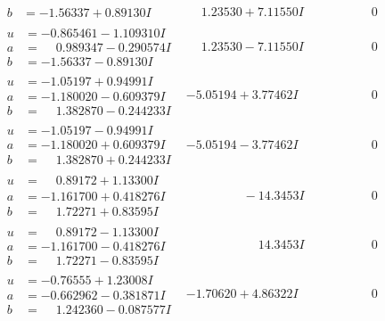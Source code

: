 \documentclass[1p]{elsarticle_modified}
\theoremstyle{definition}
\begin{document}
$$\begin{array}{c|c|c}
\begin{aligned}
b &= -1.56337 + 0.89130 I\end{aligned}
 & \phantom{-}1.23530 + 7.11550 I & \phantom{-0.000000 } 0 \\ \hline\begin{aligned}
u &= -0.865461 - 1.109310 I \\
a &= \phantom{-}0.989347 - 0.290574 I \\
b &= -1.56337 - 0.89130 I\end{aligned}
 & \phantom{-}1.23530 - 7.11550 I & \phantom{-0.000000 } 0 \\ \hline\begin{aligned}
u &= -1.05197 + 0.94991 I \\
a &= -1.180020 - 0.609379 I \\
b &= \phantom{-}1.382870 - 0.244233 I\end{aligned}
 & -5.05194 + 3.77462 I & \phantom{-0.000000 } 0 \\ \hline\begin{aligned}
u &= -1.05197 - 0.94991 I \\
a &= -1.180020 + 0.609379 I \\
b &= \phantom{-}1.382870 + 0.244233 I\end{aligned}
 & -5.05194 - 3.77462 I & \phantom{-0.000000 } 0 \\ \hline\begin{aligned}
u &= \phantom{-}0.89172 + 1.13300 I \\
a &= -1.161700 + 0.418276 I \\
b &= \phantom{-}1.72271 + 0.83595 I\end{aligned}
 & \phantom{-0.000000 } -14.3453 I & \phantom{-0.000000 } 0 \\ \hline\begin{aligned}
u &= \phantom{-}0.89172 - 1.13300 I \\
a &= -1.161700 - 0.418276 I \\
b &= \phantom{-}1.72271 - 0.83595 I\end{aligned}
 & \phantom{-0.000000 -}14.3453 I & \phantom{-0.000000 } 0 \\ \hline\begin{aligned}
u &= -0.76555 + 1.23008 I \\
a &= -0.662962 - 0.381871 I \\
b &= \phantom{-}1.242360 - 0.087577 I\end{aligned}
 & -1.70620 + 4.86322 I & \phantom{-0.000000 } 0 \\ \hline\begin{aligned}

\end{aligned}
\end{array}$$
\end{document}
